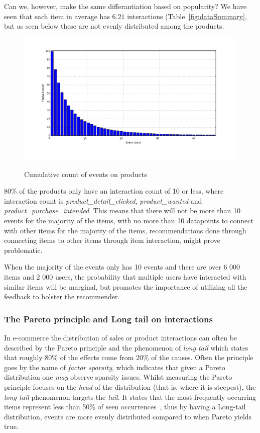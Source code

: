 Can we, however, make the same differantiation based on popularity? We have
seen that each item in average has $6.21$ interactions
(Table~\ref{fig:dataSummary}, but as seen below these are not evenly
distributed among the products.

\begin{figure}[H]
  \centering
  \includegraphics[width=\dualGraphWidth]{image/product_idcumdistribution.png}
  \label{figure:eventsPerproductCum}
  \caption{Cumulative count of events on products}
\end{figure}

80\% of the products only have an interaction count of 10 or less, where
interaction count is \emph{product\_detail\_clicked}, \emph{product\_wanted}
and \emph{product\_purchase\_intended}.  This means that there will not be more
than 10 events for the majority of the items, with no more than 10 datapoints
to connect with other items for the majority of the items, recommendations done
through connecting items to other items through item interaction, might prove
problematic.

When the majority of the events only has 10 events and there are over 6 000
items and 2 000 users, the probability that multiple users have interacted with
similar items will be marginal, but promotes the importance of utilizing all
the feedback to bolster the recommender.

\subsubsection{The Pareto principle and Long tail on interactions}

In e-commerce the distribution of sales or product interactions can often be
described by the Pareto principle and the phenomenon of \textit{long tail}
which states that roughly 80\% of the effects come from 20\% of the causes.
Often the principle goes by the name of \textit{factor sparsity}, which
indicates that given a Pareto distribution one \textit{may} observe sparsity
issues. Whilst measuring the Pareto principle focuses on the \textit{head} of
the distribution (that is, where it is steepest), the \textit{long tail}
phenomenon targets the \textit{tail}. It states that the most frequently
occurring items represent less than 50\% of seen
occurrences~\cite{DBLP:journals/corr/abs-1203-4487}, thus by having a Long-tail
distribution, events are more evenly distributed compared to when Pareto yields
true.

